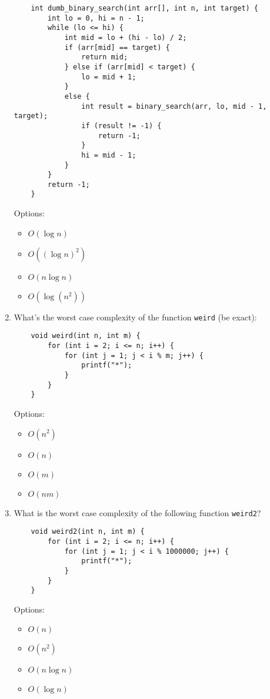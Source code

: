 \documentclass{article}
\begin{document}
\begin{enumerate}
\begin{lstlisting}
    int dumb_binary_search(int arr[], int n, int target) {
        int lo = 0, hi = n - 1;
        while (lo <= hi) {
            int mid = lo + (hi - lo) / 2;
            if (arr[mid] == target) {
                return mid;
            } else if (arr[mid] < target) {
                lo = mid + 1;
            }
            else {
                int result = binary_search(arr, lo, mid - 1, target);
                if (result != -1) {
                    return -1;
                }
                hi = mid - 1;
            }
        }
        return -1;
    }
    \end{lstlisting}
    Options:
    \begin{itemize}
        \item \( O(\log n) \)
        \item \( O((\log n)^2) \)
        \item \( O(n \log n) \)
        \item \( O(\log (n^2)) \)
    \end{itemize}

    \newpage
    
    \item What’s the worst case complexity of the function \texttt{weird} (be exact):
    \begin{lstlisting}
    void weird(int n, int m) {
        for (int i = 2; i <= n; i++) {
            for (int j = 1; j < i % m; j++) {
                printf("*");
            }
        }
    }
    \end{lstlisting}
    Options:
    \begin{itemize}
        \item \( O(n^2) \)
        \item \( O(n) \)
        \item \( O(m) \)
        \item \( O(nm) \)
    \end{itemize}

    \item What is the worst case complexity of the following function \texttt{weird2}?
    \begin{lstlisting}
    void weird2(int n, int m) {
        for (int i = 2; i <= n; i++) {
            for (int j = 1; j < i % 1000000; j++) {
                printf("*");
            }
        }
    }
    \end{lstlisting}
    Options:
    \begin{itemize}
        \item \( O(n) \)
        \item \( O(n^2) \)
        \item \( O(n \log n) \)
        \item \( O(\log n) \)
    \end{itemize}



\end{enumerate}
\end{document}
